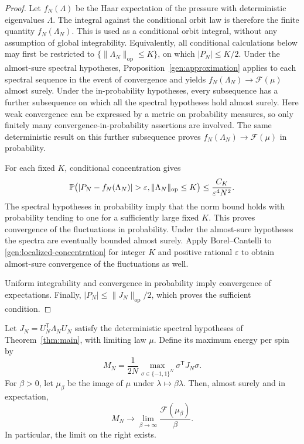 \begin{proof}
Let $f_N(\Lambda)$ be the Haar expectation of the pressure with
deterministic eigenvalues $\Lambda$.  The integral against the
conditional orbit law is therefore the finite quantity
$f_N(\Lambda_N)$.  This is used as a conditional orbit integral,
without any assumption of global integrability.  Equivalently, all
conditional calculations below may first be restricted to
$\{\|\Lambda_N\|_{\mathrm{op}}\le K\}$, on which $|P_N|\le K/2$.
Under the almost-sure spectral hypotheses,
Proposition~\ref{gen:approximation} applies to each spectral sequence
in the event of convergence and yields
$f_N(\Lambda_N)\to\mathcal F(\mu)$ almost surely.  Under the
in-probability hypotheses, every subsequence has a further subsequence
on which all the spectral hypotheses hold almost surely.  Here weak
convergence can be expressed by a metric on probability measures, so
only finitely many convergence-in-probability assertions are involved.
The same deterministic result on this further subsequence proves
$f_N(\Lambda_N)\to\mathcal F(\mu)$ in probability.

For each fixed $K$, conditional concentration gives
\begin{equation}\label{gen:localized-concentration}
 \Prob\bigl(|P_N-f_N(\Lambda_N)|>\varepsilon,
                   \|\Lambda_N\|_{\mathrm{op}}\le K\bigr)
 \le\frac{C_K}{\varepsilon^4N^2}.
\end{equation}
The spectral hypotheses in probability imply that the norm bound holds
with probability tending to one for a sufficiently large fixed $K$.
This proves convergence of the fluctuations in probability.  Under
the almost-sure hypotheses the spectra are eventually bounded almost
surely.  Apply Borel--Cantelli to
\eqref{gen:localized-concentration} for integer $K$ and positive
rational $\varepsilon$ to obtain almost-sure convergence of the
fluctuations as well.

Uniform integrability and convergence in probability imply convergence
of expectations.  Finally,
$|P_N|\le\|J_N\|_{\mathrm{op}}/2$, which proves the sufficient
condition.
\end{proof}

\begin{corollary}\label{gen:ground-state}
Let $J_N=U_N^{\mathsf T}\Lambda_NU_N$ satisfy the deterministic
spectral hypotheses of Theorem~\ref{thm:main}, with limiting law
$\mu$.  Define its maximum energy per spin by
\[
 M_N=\frac1{2N}\max_{\sigma\in\{-1,1\}^N}
                         \sigma^{\mathsf T}J_N\sigma.
\]
For $\beta>0$, let $\mu_\beta$ be the image of $\mu$ under
$\lambda\mapsto\beta\lambda$.  Then, almost surely and in
expectation,
\begin{equation}\label{gen:ground-state-formula}
 M_N\longrightarrow
 \lim_{\beta\to\infty}\frac{\mathcal F(\mu_\beta)}\beta.
\end{equation}
In particular, the limit on the right exists.
\end{corollary}

